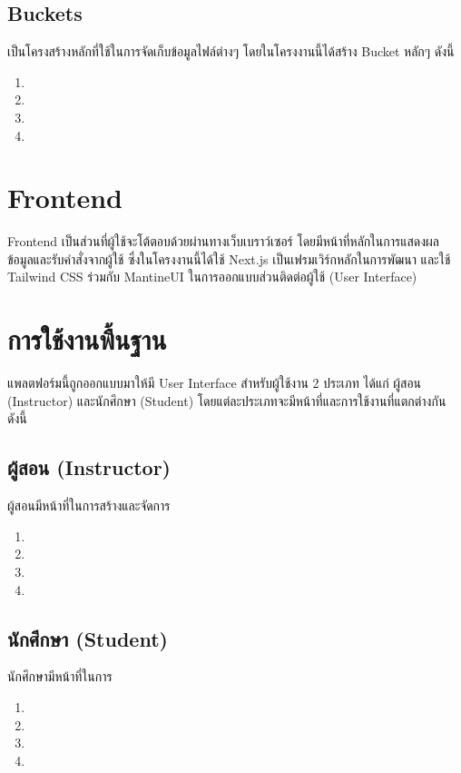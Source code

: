   \subsection{Buckets} เป็นโครงสร้างหลักที่ใช้ในการจัดเก็บข้อมูลไฟล์ต่างๆ โดยในโครงงานนี้ได้สร้าง Bucket หลักๆ ดังนี้
    \begin{enumerate}
      \item 
      \item 
      \item 
      \item 
    \end{enumerate}

\section{Frontend}
  \qquad Frontend เป็นส่วนที่ผู้ใช้จะโต้ตอบด้วยผ่านทางเว็บเบราว์เซอร์ โดยมีหน้าที่หลักในการแสดงผลข้อมูลและรับคำสั่งจากผู้ใช้
  ซึ่งในโครงงานนี้ได้ใช้ Next.js เป็นเฟรมเวิร์กหลักในการพัฒนา และใช้ Tailwind CSS ร่วมกับ MantineUI ในการออกแบบส่วนติดต่อผู้ใช้ (User Interface)

  \section{การใช้งานพื้นฐาน}
    \qquad แพลตฟอร์มนี้ถูกออกแบบมาให้มี User Interface สำหรับผู้ใช้งาน 2 ประเภท ได้แก่ ผู้สอน (Instructor) และนักศึกษา (Student) โดยแต่ละประเภทจะมีหน้าที่และการใช้งานที่แตกต่างกัน ดังนี้
  \subsection{ผู้สอน (Instructor)}
    \par\hspace*{3em} ผู้สอนมีหน้าที่ในการสร้างและจัดการ
    \begin{enumerate}
        \item 
        \item 
        \item 
        \item 
    \end{enumerate}
  \subsection{นักศึกษา (Student)}
    \par\hspace*{3em} นักศึกษามีหน้าที่ในการ
    \begin{enumerate}
        \item 
        \item 
        \item 
        \item 
    \end{enumerate}
